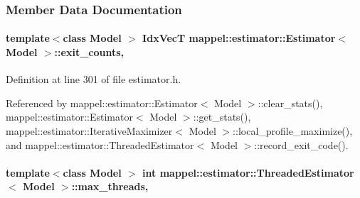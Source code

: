 \subsubsection{Member Data Documentation}
\paragraph[{\texorpdfstring{exit\+\_\+counts}{exit_counts}}]{\setlength{\rightskip}{0pt plus 5cm}template$<$class Model $>$ {\bf Idx\+VecT} {\bf mappel\+::estimator\+::\+Estimator}$<$ Model $>$\+::exit\+\_\+counts\hspace{0.3cm}{\ttfamily [protected]}, {\ttfamily [inherited]}}\hypertarget{classmappel_1_1estimator_1_1Estimator_aa946d9789a1299d684f83a822a10caa7}{}\label{classmappel_1_1estimator_1_1Estimator_aa946d9789a1299d684f83a822a10caa7}


Definition at line 301 of file estimator.\+h.



Referenced by mappel\+::estimator\+::\+Estimator$<$ Model $>$\+::clear\+\_\+stats(), mappel\+::estimator\+::\+Estimator$<$ Model $>$\+::get\+\_\+stats(), mappel\+::estimator\+::\+Iterative\+Maximizer$<$ Model $>$\+::local\+\_\+profile\+\_\+maximize(), and mappel\+::estimator\+::\+Threaded\+Estimator$<$ Model $>$\+::record\+\_\+exit\+\_\+code().

\paragraph[{\texorpdfstring{max\+\_\+threads}{max_threads}}]{\setlength{\rightskip}{0pt plus 5cm}template$<$class Model $>$ int {\bf mappel\+::estimator\+::\+Threaded\+Estimator}$<$ Model $>$\+::max\+\_\+threads\hspace{0.3cm}{\ttfamily [protected]}, {\ttfamily [inherited]}}\hypertarget{classmappel_1_1estimator_1_1ThreadedEstimator_ab4c55ecff71dff47c0584ce20fe7f077}{}\label{classmappel_1_1estimator_1_1ThreadedEstimator_ab4c55ecff71dff47c0584ce20fe7f077}


